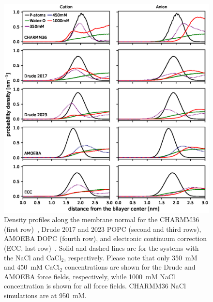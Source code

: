 \documentclass[journal=jacsat,manuscript=article,layout=singlecolumn]{achemso}
\begin{document}
\begin{figure}[!hbt]
    \centering
    \includegraphics{Figures/ion_density_profiles_with_chloride.eps}
    \caption{Density profiles along the membrane normal for the CHARMM36 (first row)~\cite{Catte2016}, Drude 2017 and 2023 POPC (second and third rows), AMOEBA DOPC (fourth row), and electronic continuum correction (ECC, last row)~\cite{Melcr:2018a}. Solid and dashed lines are for the systems with the NaCl and CaCl$_{2}$, respectively. Please note that only 350~mM and 450~mM CaCl$_{2}$ concentrations are shown for the Drude and AMOEBA force fields, respectively, while 1000~mM NaCl concentration is shown for all force fields. CHARMM36 NaCl simulations are at 950~mM.}
    \label{fig:ion_density_profiles}
\end{figure}
\end{document}
